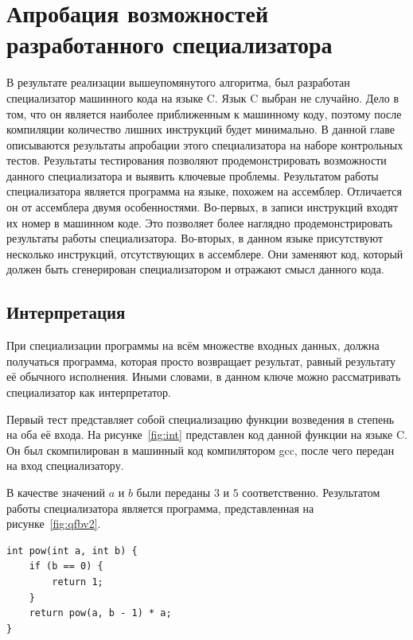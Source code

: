 \section{Апробация возможностей разработанного специализатора}
В результате реализации вышеупомянутого алгоритма, был разработан специализатор машинного кода на языке \textsf{C}. Язык \textsf{C} выбран не случайно. Дело в том, что он является наиболее приближенным к машинному коду, поэтому после компиляции количество лишних инструкций будет минимально. В данной главе описываются результаты апробации этого специализатора на наборе контрольных тестов. Результаты тестирования позволяют продемонстрировать возможности данного специализатора и выявить ключевые проблемы.
Результатом работы специализатора является программа на языке, похожем на ассемблер. Отличается он от ассемблера двумя особенностями. Во-первых, в записи инструкций входят их номер в машинном коде. Это позволяет более наглядно продемонстрировать результаты работы специализатора. Во-вторых, в данном языке присутствуют несколько инструкций, отсутствующих в ассемблере. Они заменяют код, который должен быть сгенерирован специализатором и отражают смысл данного кода.

\subsection{Интерпретация}
При специализации программы на всём множестве входных данных, должна получаться программа, которая просто возвращает результат,
равный результату её обычного исполнения.
Иными словами, в данном ключе можно рассматривать специализатор как интерпретатор.

Первый тест представляет собой специализацию функции возведения в степень на оба её входа. На рисунке~\ref{fig:int} представлен код данной функции на языке \textsf{C}. Он был скомпилирован в машинный код компилятором gcc, после чего передан на вход специализатору.

В качестве значений $a$ и $b$ были переданы $3$ и $5$ соответственно. Результатом работы специализатора является программа, представленная на рисунке~\ref{fig:qfbv2}.

\newsavebox\boxseven
\begin{lrbox}{\boxseven}
\begin{lstlisting}[xleftmargin = 20pt]
int pow(int a, int b) {
    if (b == 0) {
        return 1;
    }
    return pow(a, b - 1) * a;
}
\end{lstlisting}
\end{lrbox}

